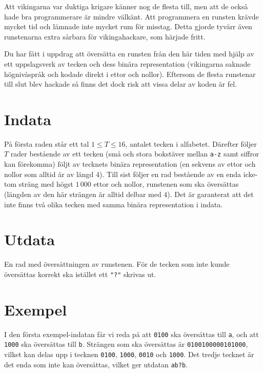 Att vikingarna var duktiga krigare känner nog de flesta till, men att de också hade bra programmerare är mindre välkänt. Att programmera en runsten krävde mycket tid och lämnade inte mycket rum för misstag. Detta gjorde tyvärr även runstenarna extra sårbara för vikingahackare, som härjade fritt.

Du har fått i uppdrag att översätta en runsten från den här tiden med hjälp av ett uppslagsverk av tecken och dess binära representation (vikingarna saknade högnivåspråk och kodade direkt i ettor och nollor). Eftersom de flesta runstenar till slut blev hackade så finns det dock risk att vissa delar av koden är fel.

\section*{Indata}
På första raden står ett tal $1 \le T \le 16$, antalet tecken i alfabetet. Därefter följer $T$ rader bestående av ett tecken (små och stora bokstäver mellan \texttt{a-z} samt siffror kan förekomma) följt av tecknets binära representation (en sekvens av ettor och nollor som alltid är av längd 4). Till sist följer en rad bestående av en enda icke-tom sträng med högst $1\,000$ ettor och nollor, runstenen som ska översättas (längden av den här strängen är alltid delbar med 4). Det är garanterat att det inte finns två olika tecken med samma binära representation i indata.

\section*{Utdata}
En rad med översättningen av runstenen. För de tecken som inte kunde översättas korrekt ska istället ett \texttt{"?"} skrivas ut.

\section*{Exempel}
I den första exempel-indatan får vi reda på att \texttt{0100} ska översättas till \texttt{a}, och att \texttt{1000} ska översättas till \texttt{b}. Strängen som ska översättas är \texttt{0100100000101000}, vilket kan delas upp i tecknen \texttt{0100}, \texttt{1000}, \texttt{0010} och \texttt{1000}. Det tredje tecknet är det enda som inte kan översättas, vilket ger utdatan \texttt{ab?b}.
